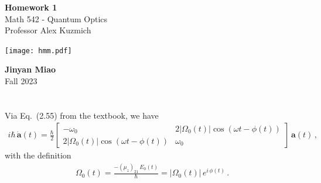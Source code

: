 \documentclass[11pt, oneside]{book}
\theoremstyle{break}
\theoremstyle{break}
\newcommand{\bmat}[1]{\begin{bmatrix} #1 \end{bmatrix}}
\begin{document}
	\begin{titlepage}
		\begin{center}
			\vspace*{0.5cm}
			\Huge \color{red}
				\textbf{Homework 1}\\
			\vspace{0.5cm}			
			\Large \color{black}
			Math 542 - Quantum Optics\\
			Professor Alex Kuzmich
			\vspace{1.5cm}

			\texttt{[image: hmm.pdf]}
			
			
			\vspace{2cm}
			\LARGE
				\textbf{Jinyan Miao}\\
				\hfill\break
				\LARGE Fall 2023\\
			\vspace{1cm}

		\vspace*{\fill}
		\end{center}			
	\end{titlepage}

\chapter{}
Via Eq.\ (2.55) from the textbook, we have
\begin{align}
i\hbar\, \dot{\mathbf{a}}(t) = \frac{\hbar}{2}
\bmat{
-\omega_0 & 2|\Omega_0(t)|\cos(\omega t- \phi(t) )\\
2|\Omega_0 (t) | \cos(\omega t - \phi(t)) & \omega_0 
}\, \mathbf{a}(t)\,,
\end{align}
with the definition
\begin{align*}
\Omega_0 (t) = \frac{-(\mu_z)_{21}\,E_0(t)}{\hbar} = |\Omega_0 (t) | \, e^{i\,\phi(t)}\,.
\end{align*}
\end{document}
